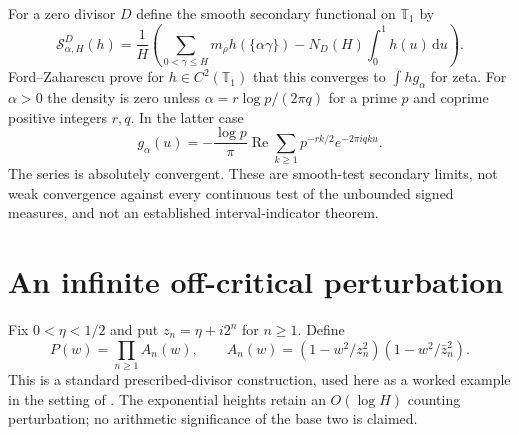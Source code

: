 \documentclass[11pt,a4paper]{article}
\theoremstyle{definition}
\theoremstyle{remark}
\newcommand{\T}{\mathbb T}
\newcommand{\dd}{\,\mathrm d}
\DeclareMathOperator{\Rea}{Re}
\begin{document}
For a zero divisor $D$ define the smooth secondary functional on $\T_1$ by
\begin{equation}\label{eq:secondary}
 \mathcal S_{\alpha,H}^{D}(h)=\frac1H
 \left(\sum_{0<\gamma\le H}m_\rho h(\{\alpha\gamma\})
              -N_D(H)\int_0^1h(u)\dd u\right).
\end{equation}
Ford--Zaharescu \cite[Theorem 1 and Corollary 2]{FZ} prove for
$h\in C^2(\T_1)$ that this converges to $\int h g_\alpha$ for zeta.
For $\alpha>0$ the density is zero unless
$\alpha=r\log p/(2\pi q)$ for a prime $p$ and coprime positive integers
$r,q$. In the latter case
\begin{equation}\label{eq:bias}
 g_\alpha(u)=-\frac{\log p}{\pi}\Rea
       \sum_{k\ge1}p^{-rk/2}e^{-2\pi i qku}.
\end{equation}
The series is absolutely convergent. These are smooth-test secondary
limits, not weak convergence against every continuous test of the unbounded
signed measures, and not an established interval-indicator theorem.

\section{An infinite off-critical perturbation}\label{sec:product}

Fix $0<\eta<1/2$ and put $z_n=\eta+i2^n$ for $n\ge1$. Define
\begin{equation}\label{eq:product}
 P(w)=\prod_{n\ge1}A_n(w),\qquad
 A_n(w)=(1-w^2/z_n^2)(1-w^2/\bar z_n^2).
\end{equation}
This is a standard prescribed-divisor construction, used here as a worked
example in the setting of \cite{GX}. The exponential heights retain an $O(\log H)$ counting
perturbation; no arithmetic significance of the base two is claimed.
\end{document}

